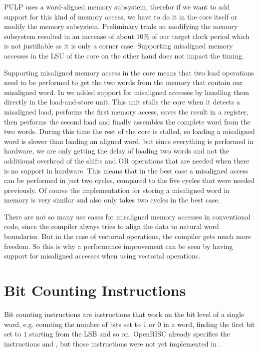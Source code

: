 \gls{PULP} uses a word-aligned memory subsystem, therefor if we want to add
support for this kind of memory access, we have to do it in the core itself or
modify the memory subsystem. Preliminary trials on modifying the memory
subsystem resulted in an increase of about 10\% of our target clock period
which is not justifiable as it is only a corner case. Supporting misaligned
memory accesses in the \gls{LSU} of the core on the other hand does not impact
the timing.

Supporting misaligned memory access in the core means that two load operations
need to be performed to get the two words from the memory that contain our
misaligned word. In \orion we added support for misaligned accesses by handling
them directly in the load-and-store unit. This unit stalls the core when it
detects a misaligned load, performs the first memory access, saves the result
in a register, then performs the second load and finally assembles the complete
word from the two words. During this time the rest of the core is stalled, so
loading a misaligned word is slower than loading an aligned word, but since
everything is performed in hardware, we are only getting the delay of loading
two words and not the additional overhead of the shifts and OR operations that
are needed when there is no support in hardware. This means that in the best
case a misaligned access can be performed in just two cycles, compared to the
five cycles that were needed previously.
Of course the implementation for storing a misaligned word in memory is very
similar and also only takes two cycles in the best case.

There are not so many use cases for misaligned memory accesses in conventional
code, since the compiler always tries to align the data to natural word
boundaries. But in the case of vectorial operations, the compiler gets much more
freedom. So this is why a performance improvement can be seen by having support
for misaligned accesses when using vectorial operations.



\section{Bit Counting Instructions}

\label{sec:bit_count}

Bit counting instructions are instructions that work on the bit level of a
single word, e.g. counting the number of bits set to $1$ or $0$ in a word,
finding the first bit set to $1$ starting from the \gls{LSB} and so on.
OpenRISC \cite{OR1KSPEC} already specifies the instructions  and
, but those instructions were not yet implemented in \orion.


